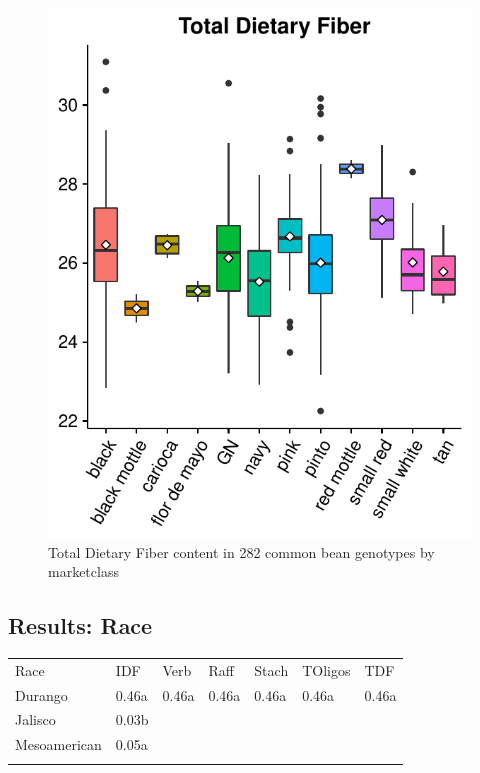 \documentclass[11pt,]{article}
\makeatletter
\def\maxwidth{\ifdim\Gin@nat@width>\linewidth\linewidth
\else\Gin@nat@width\fi}
\let\Oldincludegraphics\includegraphics
\renewcommand{\includegraphics}[1]{\Oldincludegraphics[width=\maxwidth]{#1}}
\makeatother
\begin{document}
\begin{figure}

{\centering \includegraphics{./manuscript_template_files/figure-latex/unnamed-chunk-12-1} 

}

\caption{Total Dietary Fiber content in 282 common bean genotypes by marketclass}\label{fig:unnamed-chunk-12}
\end{figure}

\subsection{Results: Race}\label{results-race}

\begin{longtable}[c]{@{}lllllll@{}}
\toprule\addlinespace
Race & IDF & Verb & Raff & Stach & TOligos & TDF
\\\addlinespace
\midrule\endhead
Durango & 0.46a & 0.46a & 0.46a & 0.46a & 0.46a & 0.46a
\\\addlinespace
Jalisco & 0.03b
\\\addlinespace
Mesoamerican & 0.05a
\\\addlinespace
\bottomrule
\end{longtable}
\end{document}
